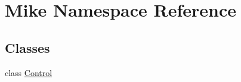 \hypertarget{namespace_mike}{}\section{Mike Namespace Reference}
\label{namespace_mike}
\subsection*{Classes}
\begin{DoxyCompactItemize}
\item 
class \hyperlink{class_mike_1_1_control}{Control}
\end{DoxyCompactItemize}
